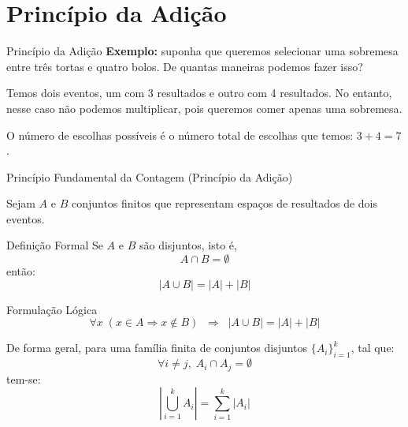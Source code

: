\documentclass[9pt]{beamer}
\begin{document}
\section{Princípio da Adição}
\begin{frame}{Princípio da Adição}
\textbf{Exemplo:} suponha que queremos selecionar uma sobremesa entre três tortas e quatro bolos. De quantas maneiras podemos fazer isso?
\vspace{0.3cm}

Temos dois eventos, um com 3 resultados e outro com 4 resultados. No entanto, nesse caso não podemos multiplicar, pois queremos comer apenas uma sobremesa.
\vspace{0.1cm}

\begin{center}
\end{center}

O número de escolhas possíveis é o número total de escolhas que temos: $3+4=7$.
\end{frame}
\begin{frame}{Princípio Fundamental da Contagem (Princípio da Adição)}

Sejam $A$ e $B$ conjuntos finitos que representam espaços de resultados de dois eventos.

\vspace{0.3cm}

\begin{block}{Definição Formal}
Se $A$ e $B$ são disjuntos, isto é,
\[
A \cap B = \emptyset
\]
então:
\[
|A \cup B| = |A| + |B|
\]
\end{block}


\begin{block}{Formulação Lógica}
\[
\forall x \; (x \in A \Rightarrow x \notin B)
\;\;\Rightarrow\;\;
|A \cup B| = |A| + |B|
\]
\end{block}


De forma geral, para uma família finita de conjuntos disjuntos $\{A_i\}_{i=1}^k$, tal que:
\[
\forall i \neq j,\; A_i \cap A_j = \emptyset
\]
tem-se:
\[
\left| \bigcup_{i=1}^{k} A_i \right| = \sum_{i=1}^{k} |A_i|
\]

\end{frame}
\end{document}
